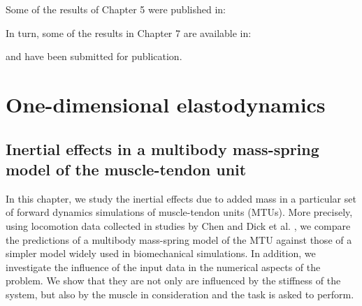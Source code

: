 \documentclass{sfuthesis}
\numberwithin{equation}{section}
\numberwithin{figure}{chapter}
\numberwithin{table}{chapter}
\theoremstyle{definition}
\begin{document}
Some of the results of Chapter 5 were published in:

\medskip
\noindent {}
\medskip

In turn, some of the results in Chapter 7 are available in:

\medskip
\noindent {}
\medskip

\noindent and have been submitted for publication.





\part{One-dimensional elastodynamics}

\chapter{Inertial effects in a multibody mass-spring model of the muscle-tendon unit} \label{ch:mass_enhanced_model}






In this chapter, we study the inertial effects due to added mass in a particular set of forward dynamics simulations of muscle-tendon units (MTUs). More precisely, using locomotion data collected in studies by Chen \cite{EvanThesis} and Dick et al. \cite{Dick2016}, we compare the predictions of a multibody mass-spring model of the MTU against those of a simpler model widely used in biomechanical simulations. In addition, we investigate the influence of the input data in the numerical aspects of the problem. We show that they are not only are influenced by the stiffness of the system, but also by the muscle in consideration and the task is asked to perform.
\end{document}
